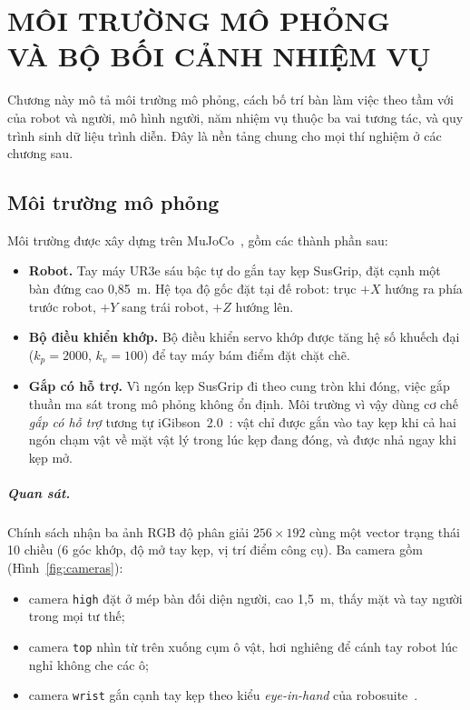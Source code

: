 \chapter[MÔI TRƯỜNG MÔ PHỎNG VÀ BỘ BỐI CẢNH NHIỆM VỤ]{MÔI TRƯỜNG MÔ PHỎNG\\VÀ BỘ BỐI CẢNH NHIỆM VỤ}
\label{chap:task-suite}

Chương này mô tả môi trường mô phỏng, cách bố trí bàn làm việc theo tầm với của robot và người, mô hình người, năm nhiệm vụ thuộc ba vai tương tác, và quy trình sinh dữ liệu trình diễn. Đây là nền tảng chung cho mọi thí nghiệm ở các chương sau.

\section{Môi trường mô phỏng}
\label{sec:sim}

Môi trường được xây dựng trên MuJoCo~\cite{todorov2012mujoco}, gồm các thành phần sau:
\begin{itemize}
  \item \textbf{Robot.} Tay máy UR3e sáu bậc tự do gắn tay kẹp SusGrip, đặt cạnh một bàn đứng cao 0,85~m. Hệ tọa độ gốc đặt tại đế robot: trục $+X$ hướng ra phía trước robot, $+Y$ sang trái robot, $+Z$ hướng lên.
  \item \textbf{Bộ điều khiển khớp.} Bộ điều khiển servo khớp được tăng hệ số khuếch đại ($k_p = 2000$, $k_v = 100$) để tay máy bám điểm đặt chặt chẽ.
  \item \textbf{Gắp có hỗ trợ.} Vì ngón kẹp SusGrip đi theo cung tròn khi đóng, việc gắp thuần ma sát trong mô phỏng không ổn định. Môi trường vì vậy dùng cơ chế \emph{gắp có hỗ trợ} tương tự iGibson~2.0~\cite{li2021igibson}: vật chỉ được gắn vào tay kẹp khi cả hai ngón chạm vật về mặt vật lý trong lúc kẹp đang đóng, và được nhả ngay khi kẹp mở.
\end{itemize}

\paragraph{Quan sát.} Chính sách nhận ba ảnh RGB độ phân giải $256\times192$ cùng một vector trạng thái 10 chiều (6 góc khớp, độ mở tay kẹp, vị trí điểm công cụ). Ba camera gồm (Hình~\ref{fig:cameras}):
\begin{itemize}
  \item camera \texttt{high} đặt ở mép bàn đối diện người, cao 1,5~m, thấy mặt và tay người trong mọi tư thế;
  \item camera \texttt{top} nhìn từ trên xuống cụm ô vật, hơi nghiêng để cánh tay robot lúc nghỉ không che các ô;
  \item camera \texttt{wrist} gắn cạnh tay kẹp theo kiểu \emph{eye-in-hand} của robosuite~\cite{zhu2020robosuite}.
\end{itemize}

